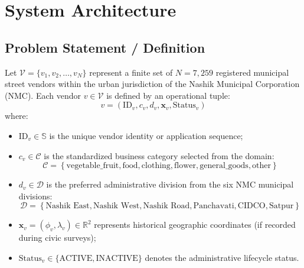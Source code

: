 \chapter{System Architecture}
\label{ch:system_architecture}

\section{Problem Statement / Definition}
\label{sec:problem_statement}

Let $\mathcal{V} = \{v_1, v_2, \dots, v_N\}$ represent a finite set of $N = 7,259$ registered municipal street vendors within the urban jurisdiction of the Nashik Municipal Corporation (NMC). Each vendor $v \in \mathcal{V}$ is defined by an operational tuple:
\begin{equation}
    v = \left( \text{ID}_v, c_v, d_v, \mathbf{x}_v, \text{Status}_v \right)
    \label{eq:vendor_tuple_def}
\end{equation}
where:
\begin{itemize}
    \item $\text{ID}_v \in \mathbb{S}$ is the unique vendor identity or application sequence;
    \item $c_v \in \mathcal{C}$ is the standardized business category selected from the domain:
    \begin{equation}
        \mathcal{C} = \left\{ \text{vegetable\_fruit}, \text{food}, \text{clothing}, \text{flower}, \text{general\_goods}, \text{other} \right\}
    \end{equation}
    \item $d_v \in \mathcal{D}$ is the preferred administrative division from the six NMC municipal divisions:
    \begin{equation}
        \mathcal{D} = \left\{ \text{Nashik East}, \text{Nashik West}, \text{Nashik Road}, \text{Panchavati}, \text{CIDCO}, \text{Satpur} \right\}
    \end{equation}
    \item $\mathbf{x}_v = (\phi_v, \lambda_v) \in \mathbb{R}^2$ represents historical geographic coordinates (if recorded during civic surveys);
    \item $\text{Status}_v \in \{\text{ACTIVE}, \text{INACTIVE}\}$ denotes the administrative lifecycle status.
\end{itemize}

